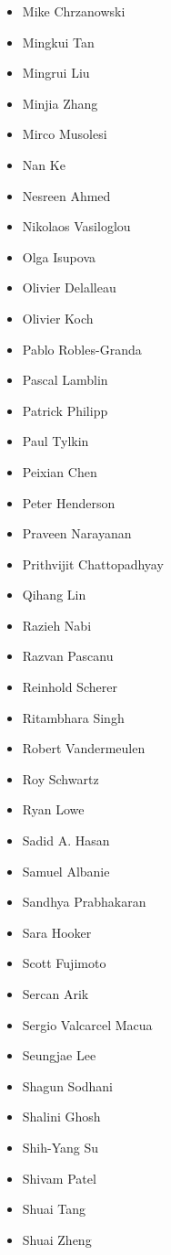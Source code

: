 \begin{multicols}{3}
\begin{itemize}[label={}]
    \item Mike Chrzanowski
    \item Mingkui Tan
    \item Mingrui Liu
    \item Minjia Zhang
    \item Mirco Musolesi
    \item Nan Ke
    \item Nesreen Ahmed
    \item Nikolaos Vasiloglou
    \item Olga Isupova
    \item Olivier Delalleau
    \item Olivier Koch
    \item Pablo Robles-Granda
    \item Pascal Lamblin
    \item Patrick Philipp
    \item Paul Tylkin
    \item Peixian Chen
    \item Peter Henderson
    \item Praveen Narayanan
    \item Prithvijit Chattopadhyay
    \item Qihang Lin
    \item Razieh Nabi
    \item Razvan Pascanu
    \item Reinhold Scherer
    \item Ritambhara Singh
    \item Robert Vandermeulen
    \item Roy Schwartz
    \item Ryan Lowe
    \item Sadid A. Hasan
    \item Samuel Albanie
    \item Sandhya Prabhakaran
    \item Sara Hooker
    \item Scott Fujimoto
    \item Sercan Arik
    \item Sergio Valcarcel Macua
    \item Seungjae Lee
    \item Shagun Sodhani
    \item Shalini Ghosh
    \item Shih-Yang Su
    \item Shivam Patel
    \item Shuai Tang
    \item Shuai Zheng

\end{itemize}
\end{multicols}
